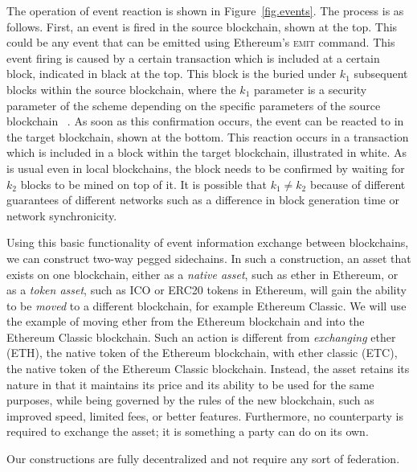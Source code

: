 The operation of event reaction is shown in Figure~\ref{fig.events}. The process
is as follows. First, an event is fired in the source blockchain, shown at the
top. This could be any event that can be emitted using Ethereum's \textsc{emit}
command. This event firing is caused by a certain transaction which is included
at a certain block, indicated in black at the top. This block is the buried
under $k_1$ subsequent blocks within the source blockchain, where the $k_1$
parameter is a security parameter of the scheme depending on the specific
parameters of the source blockchain ~\cite{EC:GarKiaLeo15}. As soon as this
confirmation occurs, the event can be reacted to in the target blockchain, shown
at the bottom. This reaction occurs in a transaction which is included in a
block within the target blockchain, illustrated in white. As is usual even in
local blockchains, the block needs to be confirmed by waiting for $k_2$ blocks
to be mined on top of it. It is possible that $k_1 \neq k_2$ because of
different guarantees of different networks such as a difference in block
generation time or network synchronicity.

Using this basic functionality of event information exchange between
blockchains, we can construct two-way pegged sidechains. In such a construction,
an asset that exists on one blockchain, either as a \emph{native asset}, such as
ether in Ethereum, or as a \emph{token asset}, such as ICO or ERC20 tokens in
Ethereum, will gain the ability to be \emph{moved} to a different blockchain,
for example Ethereum Classic. We will use the example of moving ether from the
Ethereum blockchain and into the Ethereum Classic blockchain. Such an action is
different from \emph{exchanging} ether (ETH), the native token of the Ethereum
blockchain, with ether classic (ETC), the native token of the Ethereum Classic
blockchain. Instead, the asset retains its nature in that it maintains its price
and its ability to be used for the same purposes, while being governed by the
rules of the new blockchain, such as improved speed, limited fees, or better
features. Furthermore, no counterparty is required to exchange the asset; it is
something a party can do on its own.

Our constructions are fully decentralized and not require any sort of
federation.
